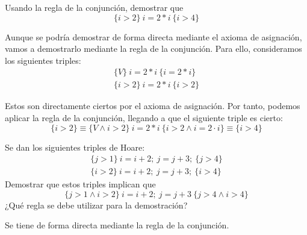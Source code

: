 \begin{ejercicio}
    Usando la regla de la conjunción, demostrar que 
    \begin{equation*}
        \{i>2\}\ i=2\ast i\ \{i>4\}
    \end{equation*}
    
    Aunque se podría demostrar de forma directa mediante el axioma de asignación, vamos a demostrarlo mediante la regla de la conjunción. Para ello, consideramos los siguientes triples:
    \begin{gather*}
        \{V\} \ i=2\ast i\ \{i=2\ast i\} \\
        \{i> 2\} \ i=2\ast i\ \{i>2\}
    \end{gather*}

    Estos son directamente ciertos por el axioma de asignación. Por tanto, podemos aplicar la regla de la conjunción, llegando a que el siguiente triple es cierto:
    \begin{equation*}
        \{i>2\}\equiv \{V\land i>2\}\ i=2\ast i\ \{i>2\land i=2\cdot i\}\equiv \{i>4\}
    \end{equation*}
\end{ejercicio}

\begin{ejercicio}
    Se dan los siguientes triples de Hoare:
    \begin{gather*}
        \{j>1\}\ i=i+2;\ j=j+3;\ \{j>4\} \\
        \{i>2\}\ i=i+2;\ j=j+3;\ \{i>4\}
    \end{gather*}
    Demostrar que estos triples implican que
    \begin{equation*}
        \{j>1 \land i>2\}\ i=i+2;\ j=j+3\ \{j>4 \land i>4\}
    \end{equation*}
    ¿Qué regla se debe utilizar para la demostración?

    Se tiene de forma directa mediante la regla de la conjunción.
\end{ejercicio}

